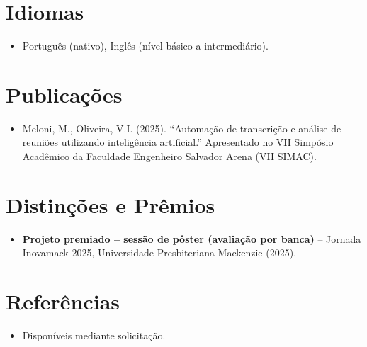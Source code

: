 \documentclass[11pt,a4paper,sans]{moderncv}
\begin{document}

\section{Idiomas}
\vspace{1pt}
\begin{itemize}
\item Português (nativo), Inglês (nível básico a intermediário).
\end{itemize}


\section{Publicações}
\vspace{1pt}
\begin{itemize}
\item Meloni, M., Oliveira, V.I. (2025). ``Automação de transcrição e análise de reuniões utilizando inteligência artificial.'' Apresentado no VII Simpósio Acadêmico da Faculdade Engenheiro Salvador Arena (VII SIMAC).
\end{itemize}


\section{Distinções e Prêmios}
\vspace{1pt}
\begin{itemize}
\item{\textbf{Projeto premiado -- sessão de pôster (avaliação por banca)} -- Jornada Inovamack 2025, Universidade Presbiteriana Mackenzie (2025).}
\end{itemize}


\section{Referências}
\vspace{1pt}
\begin{itemize}
\item{Disponíveis mediante solicitação.}
\end{itemize}
\end{document}
